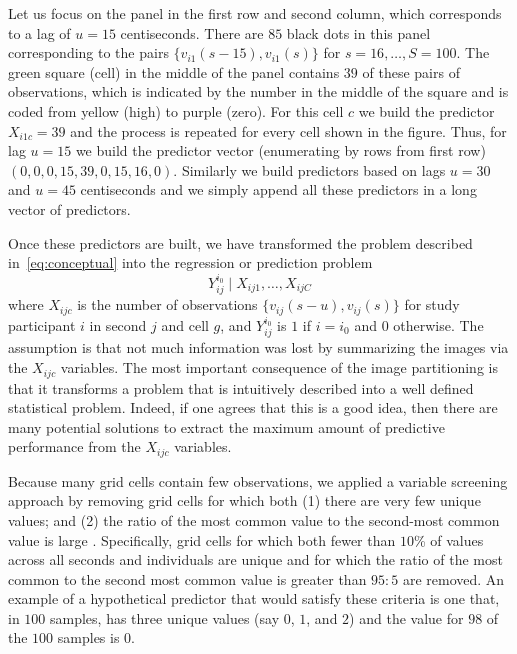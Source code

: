 Let us focus on the panel in the first row and second column, which corresponds to a lag of $u=15$ centiseconds. There are $85$ black dots in this panel corresponding to the pairs $\{v_{i1}(s-15),v_{i1}(s)\}$ for $s=16,\ldots,S=100$. The green square (cell) in the middle of the panel contains $39$ of these pairs of observations, which is indicated by the number in the middle of the square and is coded from yellow (high) to purple (zero). For this cell $c$ we build the predictor $X_{i1c}=39$ and the process is repeated for every cell shown in the figure. Thus, for lag $u=15$ we build the predictor vector (enumerating by rows from first row) $(0,0,0,15,39,0,15,16,0)$. Similarly we build predictors based on lags $u=30$ and $u=45$ centiseconds and we simply append all these predictors in a long vector of predictors.

Once these predictors are built, we have transformed the problem described in~\eqref{eq:conceptual} into the regression or prediction problem
\begin{equation}
Y_{ij}^{i_0}\;| \;X_{ij1},\ldots,X_{ijC}
\label{eq:partitioning_reg}
\end{equation}
where $X_{ijc}$ is the number of observations $\{v_{ij}(s-u),v_{ij}(s)\}$ for study participant $i$ in second $j$ and cell $g$, and $Y_{ij}^{i_0}$ is $1$ if $i=i_0$ and $0$ otherwise. The assumption is that not much information was lost by summarizing the images via the $X_{ijc}$ variables. The most important consequence of the image partitioning is that it transforms a problem that is intuitively described into a well defined statistical problem. Indeed, if one agrees that this is a good idea, then there are many potential solutions to extract the maximum amount of predictive performance from the $X_{ijc}$ variables. 


Because many grid cells contain few observations, we applied a variable screening approach by removing grid cells for which both (1) there are very few unique values; and (2) the ratio of the most common value to the second-most common value is large \cite{recipes}. Specifically, grid cells for which both fewer than $10$\% of values across all seconds and individuals are unique and for which the ratio of the most common to the second most common value is greater than $95:5$ are removed. An example of a hypothetical predictor that would satisfy these criteria is one that, in $100$ samples, has three unique values (say $0$, $1$, and $2$) and the value for $98$ of the $100$ samples is $0$. 




